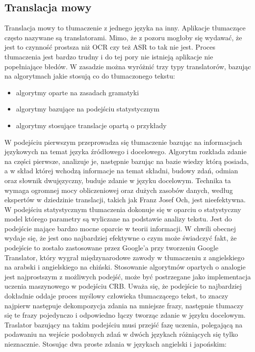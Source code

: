 \subsection{Translacja mowy}
Translacja mowy to tłumaczenie z jednego języka na inny. Aplikacje tłumaczące często nazywane są translatorami. Mimo, że z pozoru mogłoby się wydawać, że jest to czynność prostsza niż OCR czy też ASR to tak nie jest. Proces tłumaczenia jest bardzo trudny i do tej pory nie istnieją aplikacje nie popełniające błedów. W zasadzie można wyróżnić trzy typy translatorów, bazując na algorytmach jakie stosują co do tłumaczonego tekstu:
\begin{itemize}
	\item algorytmy oparte na zasadach gramatyki
	\item algorytmy bazujące na podejściu statystycznym
	\item algorytmy stosujące translacje opartą o przykłady
\end{itemize}
W podejściu pierwszym przeprowadza się tłumaczenie bazując na informacjach językowych na temat języka źródłowego i docelowego. Algorytm rozkłada zdanie na części pierwsze, analizuje je, następnie bazując na bazie wiedzy którą posiada, a w skład której wchodzą informacje na temat składni, budowy zdań, odmian oraz słownik dwujęzyczny, buduje zdanie w języku docelowym. Technika ta wymaga ogromnej mocy obliczeniowej oraz dużych zasobów danych, według ekspertów w dziedzinie translacji, takich jak Franz Josef Och, jest nieefektywna.
W podejściu statystycznym tłumaczenia dokonuje się w oparciu o statystyczny model którego parametry są wyliczane na podstawie analizy tekstu. Jest do podejście mające bardzo mocne oparcie w teorii informacji. W chwili obecnej wydaje się, że jest ono najbardziej efektywne o czym może świadczyć fakt, że podejście to zostało zastosowane przez Google'a przy tworzeniu Google Translator, który wygrał międzynarodowe zawody w tłumaczeniu z angielskiego na arabski i angielskiego na chiński.
Stosowanie algorytmów opartych o analogie jest najprostszym z możliwych podejść, może być postrzegane jako implementacja uczenia maszynowego w podejściu CRB. Uważa się, że podejście to najbardziej dokładnie oddaje proces myślowy człowieka tłumaczącego tekst, to znaczy najpierw następuje dekompozycja zdania na mniejsze frazy, następnie tłumaczy się te frazy pojedynczo i odpowiedno łączy tworząc zdanie w języku docelowym. Traslator bazujący na takim podejściu musi przejść fazę uczenia, polegającą na podawaniu na wejście podobnych zdań w dwóch językach różniących się tylko nieznacznie. Stosując dwa proste zdania w językach angielski i japońskim: 
